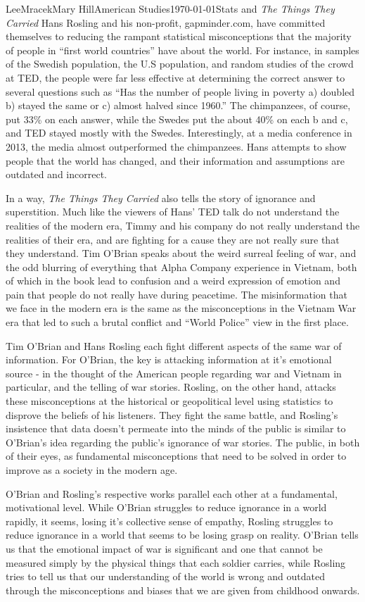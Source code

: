 \documentclass[11pt,letterpaper]{article}
\begin{document}
\begin{mla}{Lee}{Mracek}{Mary Hill}{American Studies}{\today}{Stats and \textit{The Things They Carried}}
    Hans Rosling and his non-profit, gapminder.com, have committed themselves to reducing the rampant statistical misconceptions that the majority of people in ``first world countries'' have about the world. For instance, in samples of the Swedish population, the U.S population, and random studies of the crowd at TED, the people were far less effective at determining the correct answer to several questions such as ``Has the number of people living in poverty a) doubled b) stayed the same or c) almost halved since 1960.'' The chimpanzees, of course, put 33\% on each answer, while the Swedes put the about 40\% on each b and c, and TED stayed mostly with the Swedes. Interestingly, at a media conference in 2013, the media almost outperformed the chimpanzees. Hans attempts to show people that the world has changed, and their information and assumptions are outdated and incorrect.

    In a way, \textit{The Things They Carried} also tells the story of ignorance and superstition. Much like the viewers of Hans' TED talk do not understand the realities of the modern era, Timmy and his company do not really understand the realities of their era, and are fighting for a cause they are not really sure that they understand. Tim O'Brian speaks about the weird surreal feeling of war, and the odd blurring of everything that Alpha Company experience in Vietnam, both of which in the book lead to confusion and a weird expression of emotion and pain that people do not really have during peacetime. The misinformation that we face in the modern era is the same as the misconceptions in the Vietnam War era that led to such a brutal conflict and ``World Police'' view in the first place.

    Tim O'Brian and Hans Rosling each fight different aspects of the same war of information. For O'Brian, the key is attacking information at it's emotional source - in the thought of the American people regarding war and Vietnam in particular, and the telling of war stories. Rosling, on the other hand, attacks these misconceptions at the historical or geopolitical level using statistics to disprove the beliefs of his listeners. They fight the same battle, and Rosling's insistence that data doesn't permeate into the minds of the public is similar to O'Brian's idea regarding the public's ignorance of war stories. The public, in both of their eyes, as fundamental misconceptions that need to be solved in order to improve as a society in the modern age.

    O'Brian and Rosling's respective works parallel each other at a fundamental, motivational level. While O'Brian struggles to reduce ignorance in a world rapidly, it seems, losing it's collective sense of empathy, Rosling struggles to reduce ignorance in a world that seems to be losing grasp on reality. O'Brian tells us that the emotional impact of war is significant and one that cannot be measured simply by the physical things that each soldier carries, while Rosling tries to tell us that our understanding of the world is wrong and outdated through the misconceptions and biases that we are given from childhood onwards.
\end{mla}
\end{document}

